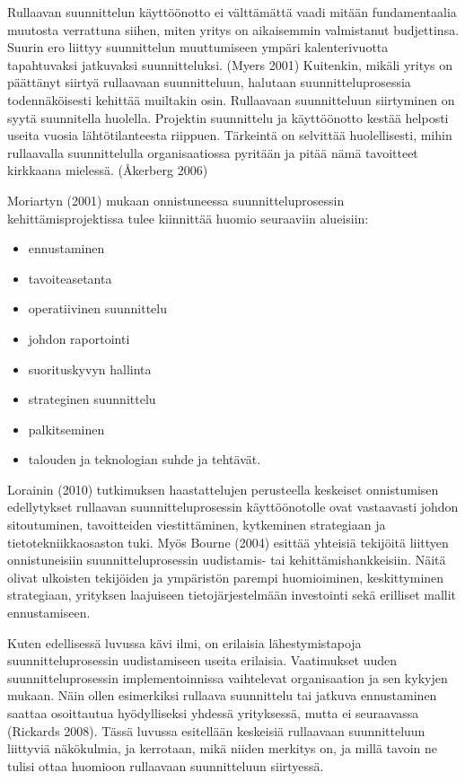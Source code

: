 \documentclass[12pt,a4paper,oneside,pdftex]{report}
\begin{document}
Rullaavan suunnittelun käyttöönotto ei välttämättä vaadi mitään fundamentaalia muutosta verrattuna siihen, miten yritys on aikaisemmin valmistanut budjettinsa. Suurin ero liittyy suunnittelun muuttumiseen ympäri kalenterivuotta tapahtuvaksi jatkuvaksi suunnitteluksi. (Myers 2001) Kuitenkin, mikäli yritys on päättänyt siirtyä rullaavaan suunnitteluun, halutaan suunnitteluprosessia todennäköisesti kehittää muiltakin osin. Rullaavaan suunnitteluun siirtyminen on syytä suunnitella huolella. Projektin suunnittelu ja käyttöönotto kestää helposti useita vuosia lähtötilanteesta riippuen.  Tärkeintä on selvittää huolellisesti, mihin rullaavalla suunnittelulla organisaatiossa pyritään ja pitää nämä tavoitteet kirkkaana mielessä. (Åkerberg 2006)

Moriartyn (2001) mukaan onnistuneessa suunnitteluprosessin kehittämisprojektissa tulee kiinnittää huomio seuraaviin alueisiin:

\begin{itemize}
\setlength{\itemsep}{0pt}
\item ennustaminen
\item tavoiteasetanta
\item operatiivinen suunnittelu
\item johdon raportointi
\item suorituskyvyn hallinta
\item strateginen suunnittelu
\item palkitseminen
\item talouden ja teknologian suhde ja tehtävät.
\end{itemize}

Lorainin (2010) tutkimuksen haastattelujen perusteella keskeiset onnistumisen edellytykset rullaavan suunnitteluprosessin käyttöönotolle ovat vastaavasti johdon sitoutuminen, tavoitteiden viestittäminen, kytkeminen strategiaan ja tietotekniikkaosaston tuki. Myös Bourne (2004) esittää yhteisiä tekijöitä liittyen onnistuneisiin suunnitteluprosessin uudistamis- tai kehittämishankkeisiin. Näitä olivat ulkoisten tekijöiden ja ympäristön parempi huomioiminen, keskittyminen strategiaan, yrityksen laajuiseen tietojärjestelmään investointi sekä erilliset mallit ennustamiseen.

Kuten edellisessä luvussa kävi ilmi, on erilaisia lähestymistapoja suunnitteluprosessin uudistamiseen useita erilaisia. Vaatimukset uuden suunnitteluprosessin implementoinnissa vaihtelevat organisaation ja sen kykyjen mukaan. Näin ollen esimerkiksi rullaava suunnittelu tai jatkuva ennustaminen saattaa osoittautua hyödylliseksi yhdessä yrityksessä, mutta ei seuraavassa (Rickards 2008). Tässä luvussa esitellään keskeisiä rullaavaan suunnitteluun liittyviä näkökulmia, ja kerrotaan, mikä niiden merkitys on, ja millä tavoin ne tulisi ottaa huomioon rullaavaan suunnitteluun siirtyessä.
\end{document}
